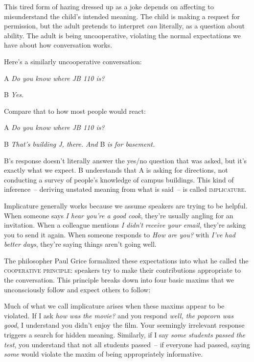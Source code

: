 This tired form of hazing dressed up as a joke depends on affecting to misunderstand the child's intended meaning. The child is making a request for permission, but the adult pretends to interpret \textit{can} literally, as a question about ability. The adult is being uncooperative, violating the normal expectations we have about how conversation works.

Here's a similarly uncooperative conversation:

\begin{dialogue}
\item[A] \textit{Do you know where JB 110 is?}
\item[B] \textit{Yes.}
\end{dialogue}
Compare that to how most people would react:

\begin{dialogue}
\item[A] \textit{Do you know where JB 110 is?}
\item[B] \textit{That's building J, there. And }B\textit{ is for basement.}
\end{dialogue}

B's response doesn't literally answer the yes/no question that was asked, but it's exactly what we expect. B understands that A is asking for directions, not conducting a survey of people's knowledge of campus buildings. This kind of inference~-- deriving unstated meaning from what is said~-- is called \textsc{implicature}.

Implicature generally works because we assume speakers are trying to be helpful. When someone says \textit{I hear you're a good cook}, they're usually angling for an invitation. When a colleague mentions \textit{I didn't receive your email}, they're asking you to send it again. When someone responds to \textit{How are you?} with \textit{I've had better days}, they're saying things aren't going well.

The philosopher Paul Grice formalized these expectations into what he called the \textsc{cooperative principle}: speakers try to make their contributions appropriate to the conversation. This principle breaks down into four basic maxims that we unconsciously follow and expect others to follow:

\ea
   \z
\z

Much of what we call implicature arises when these maxims appear to be violated. If I ask \textit{how was the movie?} and you respond \textit{well, the popcorn was good}, I understand you didn't enjoy the film. Your seemingly irrelevant response triggers a search for hidden meaning. Similarly, if I say \textit{some students passed the test}, you understand that not all students passed~-- if everyone had passed, saying \textit{some} would violate the maxim of being appropriately informative.

